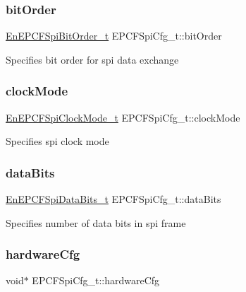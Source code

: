 \subsubsection{\texorpdfstring{bit\+Order}{bitOrder}}
{\footnotesize\ttfamily \mbox{\hyperlink{spi_8h_a5669bc3ec8d7e355a15f0b6e37a0ff7b}{En\+E\+P\+C\+F\+Spi\+Bit\+Order\+\_\+t}} E\+P\+C\+F\+Spi\+Cfg\+\_\+t\+::bit\+Order}

Specifies bit order for spi data exchange \mbox{\label{structEPCFSpiCfg__t_a3cdc8c111b764560873fd65da25a234e}} 
\subsubsection{\texorpdfstring{clock\+Mode}{clockMode}}
{\footnotesize\ttfamily \mbox{\hyperlink{spi_8h_ab09c9cb12602a4eaf6e6814aecb7f69d}{En\+E\+P\+C\+F\+Spi\+Clock\+Mode\+\_\+t}} E\+P\+C\+F\+Spi\+Cfg\+\_\+t\+::clock\+Mode}

Specifies spi clock mode \mbox{\label{structEPCFSpiCfg__t_a3468918ae35e8c3d2848aa263a12a80b}} 
\subsubsection{\texorpdfstring{data\+Bits}{dataBits}}
{\footnotesize\ttfamily \mbox{\hyperlink{spi_8h_a10cc73e5172b31534f1e7adfc0da0a74}{En\+E\+P\+C\+F\+Spi\+Data\+Bits\+\_\+t}} E\+P\+C\+F\+Spi\+Cfg\+\_\+t\+::data\+Bits}

Specifies number of data bits in spi frame \mbox{\label{structEPCFSpiCfg__t_aa62d289f92ac272e68466286b03f76db}} 
\subsubsection{\texorpdfstring{hardware\+Cfg}{hardwareCfg}}
{\footnotesize\ttfamily void$\ast$ E\+P\+C\+F\+Spi\+Cfg\+\_\+t\+::hardware\+Cfg}

